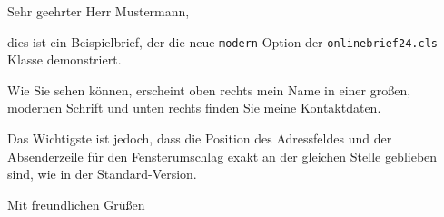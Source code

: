 \documentclass[modern, footercenter]{../onlinebrief24}
\begin{document}
\begin{letter}{}
    \opening{Sehr geehrter Herr Mustermann,}
    
    dies ist ein Beispielbrief, der die neue \texttt{modern}-Option der \texttt{onlinebrief24.cls} Klasse demonstriert.
    
    Wie Sie sehen können, erscheint oben rechts mein Name in einer großen, modernen Schrift und unten rechts finden Sie meine Kontaktdaten.
    
    Das Wichtigste ist jedoch, dass die Position des Adressfeldes und der Absenderzeile für den Fensterumschlag exakt an der gleichen Stelle geblieben sind, wie in der Standard-Version.
    
    \closing{Mit freundlichen Grüßen}
\end{letter}
\end{document}
